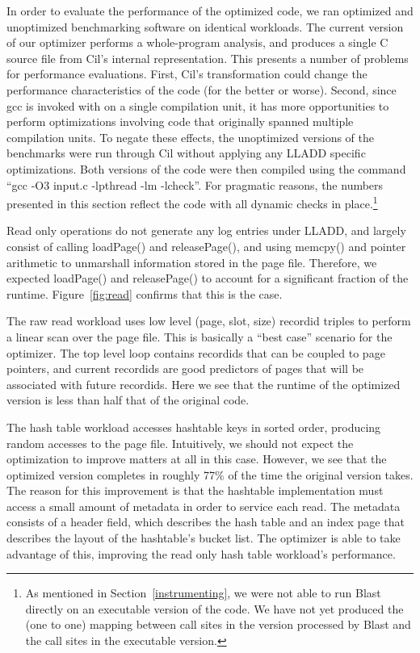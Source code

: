 \documentclass[10pt,letterpaper,twocolumn,english]{article}
\newcommand{\yad}{LLADD\xspace}
\newcommand{\pin}{loadPage()\xspace}
\newcommand{\unpin}{releasePage()\xspace}
\begin{document}
In order to evaluate the performance of the optimized code, we ran
optimized and unoptimized benchmarking software on identical
workloads.  The current version of our optimizer performs a
whole-program analysis, and produces a single C source file from Cil's
internal representation.  This presents a number of problems for
performance evaluations.  First, Cil's transformation could change the
performance characteristics of the code (for the better or worse).
Second, since gcc is invoked with on a single compilation unit, it has
more opportunities to perform optimizations involving code that
originally spanned multiple compilation units.  To negate these
effects, the unoptimized versions of the benchmarks were run through
Cil without applying any \yad specific optimizations.  Both versions
of the code were then compiled using the command ``gcc -O3 input.c
-lpthread -lm -lcheck''.  For pragmatic reasons, the numbers presented
in this section reflect the code with all dynamic checks in
place.\footnote{As mentioned in Section~\ref{instrumenting}, we were
not able to run Blast directly on an executable version of the code.
We have not yet produced the (one to one) mapping between call sites
in the version processed by Blast and the call sites in the executable version.}

Read only operations do not generate any log entries under \yad, and
largely consist of calling \pin and \unpin, and using memcpy() and
pointer arithmetic to unmarshall information stored in the page file.
Therefore, we expected \pin and \unpin to account for a significant
fraction of the runtime.  Figure~\ref{fig:read} confirms that this is
the case.

The raw read workload uses low level (page, slot, size) recordid
triples to perform a linear scan over the page file.  This is
basically a ``best case'' scenario for the optimizer.  The top level
loop contains recordids that can be coupled to page pointers, and
current recordids are good predictors of pages that will be associated
with future recordids.  Here we see that the runtime of the optimized
version is less than half that of the original code.

The hash table workload accesses hashtable keys in sorted order,
producing random accesses to the page file.  Intuitively, we should not
expect the optimization to improve matters at all in this case.
However, we see that the optimized version completes in roughly 77\%
of the time the original version takes.  The reason for this
improvement is that the hashtable implementation must access a small
amount of metadata in order to service each read.  The metadata
consists of a header field, which describes the hash table and an
index page that describes the layout of the hashtable's bucket list.
The optimizer is able to take advantage of this, improving the
read only hash table workload's performance.
\end{document}
